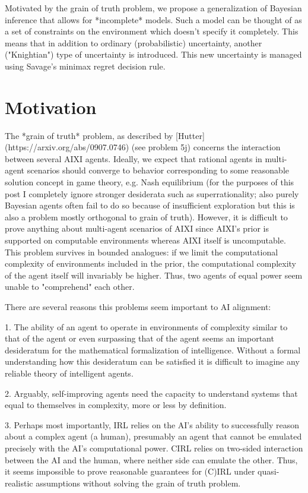 \documentclass[a4paper]{article}
\begin{document}
Motivated by the grain of truth problem, we propose a generalization of Bayesian inference that allows for *incomplete* models. Such a model can be thought of as a set of constraints on the environment which doesn't specify it completely. This means that in addition to ordinary (probabilistic) uncertainty, another ("Knightian") type of uncertainty is introduced. This new uncertainty is managed using Savage's minimax regret decision rule.

\section{Motivation}

The *grain of truth* problem, as described by [Hutter](https://arxiv.org/abs/0907.0746) (see problem 5j) concerns the interaction between several AIXI agents. Ideally, we expect that rational agents in multi-agent scenarios should converge to behavior corresponding to some reasonable solution concept in game theory, e.g. Nash equilibrium (for the purposes of this post I completely ignore stronger desiderata such as superrationality; also purely Bayesian agents often fail to do so because of insufficient exploration but this is also a problem mostly orthogonal to grain of truth). However, it is difficult to prove anything about multi-agent scenarios of AIXI since AIXI's prior is supported on computable environments whereas AIXI itself is uncomputable. This problem survives in bounded analogues: if we limit the computational complexity of environments included in the prior, the computational complexity of the agent itself will invariably be higher. Thus, two agents of equal power seem unable to "comprehend" each other.

There are several reasons this problems seem important to AI alignment:

1. The ability of an agent to operate in environments of complexity similar to that of the agent or even surpassing that of the agent seems an important desideratum for the mathematical formalization of intelligence. Without a formal understanding how this desideratum can be satisfied it is difficult to imagine any reliable theory of intelligent agents.

2. Arguably, self-improving agents need the capacity to understand systems that equal to themselves in complexity, more or less by definition.

3. Perhaps most importantly, IRL relies on the AI's ability to successfully reason about a complex agent (a human), presumably an agent that cannot be emulated precisely with the AI's computational power. CIRL relies on two-sided interaction between the AI and the human, where neither side can emulate the other. Thus, it seems impossible to prove reasonable guarantees for (C)IRL under quasi-realistic assumptions without solving the grain of truth problem.
\end{document}
